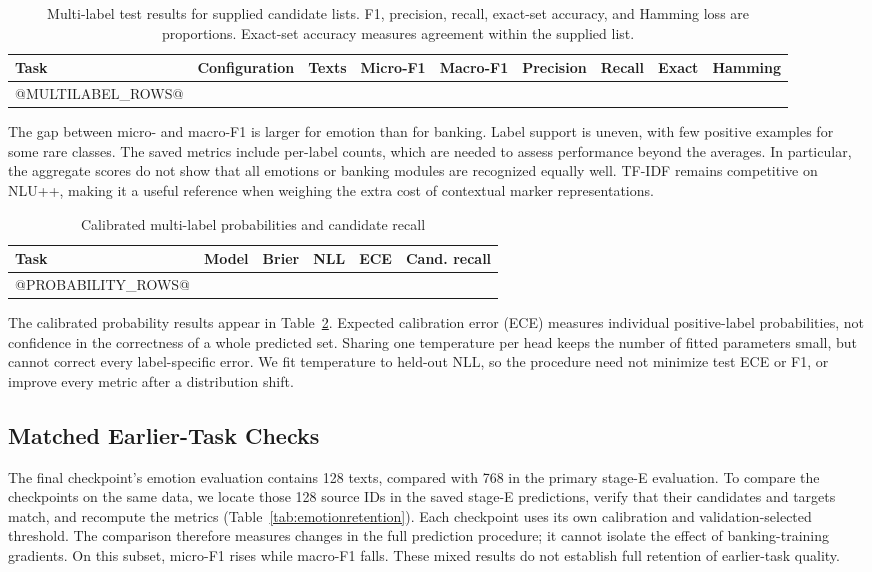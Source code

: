 \documentclass[conference]{IEEEtran}
\begin{document}
\begin{table}[!t]
\caption{Multi-label test results for supplied candidate lists. F1, precision, recall, exact-set accuracy, and Hamming loss are proportions. Exact-set accuracy measures agreement within the supplied list.}
\label{tab:multilabel}
\centering\footnotesize\setlength{\tabcolsep}{4.5pt}
\begin{tabular}{llrrrrrrr}\toprule
Task & Configuration & Texts & Micro-F1 & Macro-F1 & Precision & Recall & Exact & Hamming\\\midrule
@MULTILABEL_ROWS@
\bottomrule\end{tabular}
\end{table}

The gap between micro- and macro-F1 is larger for emotion than for banking. Label support is uneven, with few positive examples for some rare classes. The saved metrics include per-label counts, which are needed to assess performance beyond the averages. In particular, the aggregate scores do not show that all emotions or banking modules are recognized equally well. TF-IDF remains competitive on NLU++, making it a useful reference when weighing the extra cost of contextual marker representations.

\begin{table}[!t]
\caption{Calibrated multi-label probabilities and candidate recall}
\label{tab:probability}
\centering\scriptsize\setlength{\tabcolsep}{3pt}
\begin{tabular}{llrrrr}\toprule
Task & Model & Brier & NLL & ECE & Cand. recall\\\midrule
@PROBABILITY_ROWS@
\bottomrule\end{tabular}
\end{table}

The calibrated probability results appear in Table~\ref{tab:probability}. Expected calibration error (ECE) measures individual positive-label probabilities, not confidence in the correctness of a whole predicted set. Sharing one temperature per head keeps the number of fitted parameters small, but cannot correct every label-specific error. We fit temperature to held-out NLL, so the procedure need not minimize test ECE or F1, or improve every metric after a distribution shift.

\subsection{Matched Earlier-Task Checks}
The final checkpoint's emotion evaluation contains 128 texts, compared with 768 in the primary stage-E evaluation. To compare the checkpoints on the same data, we locate those 128 source IDs in the saved stage-E predictions, verify that their candidates and targets match, and recompute the metrics (Table~\ref{tab:emotionretention}). Each checkpoint uses its own calibration and validation-selected threshold. The comparison therefore measures changes in the full prediction procedure; it cannot isolate the effect of banking-training gradients. On this subset, micro-F1 rises while macro-F1 falls. These mixed results do not establish full retention of earlier-task quality.
\end{document}
